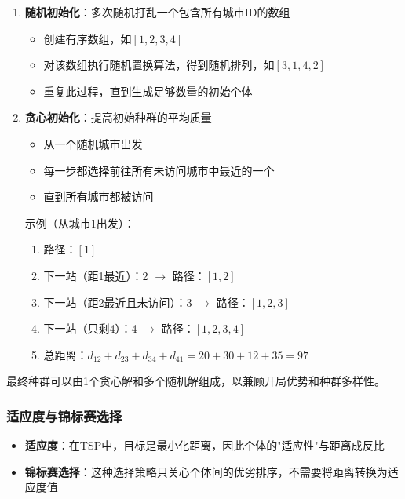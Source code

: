 \begin{enumerate}
    \item \textbf{随机初始化}：多次随机打乱一个包含所有城市ID的数组
    \begin{itemize}
        \item 创建有序数组，如$[1, 2, 3, 4]$
        \item 对该数组执行随机置换算法，得到随机排列，如$[3, 1, 4, 2]$
        \item 重复此过程，直到生成足够数量的初始个体
    \end{itemize}
    
    \item \textbf{贪心初始化}：提高初始种群的平均质量
    \begin{itemize}
        \item 从一个随机城市出发
        \item 每一步都选择前往所有未访问城市中最近的一个
        \item 直到所有城市都被访问
    \end{itemize}
    
    示例（从城市1出发）：
    \begin{enumerate}
        \item 路径：$[1]$
        \item 下一站（距1最近）：2 $\to$ 路径：$[1, 2]$
        \item 下一站（距2最近且未访问）：3 $\to$ 路径：$[1, 2, 3]$
        \item 下一站（只剩4）：4 $\to$ 路径：$[1, 2, 3, 4]$
        \item 总距离：$d_{12} + d_{23} + d_{34} + d_{41} = 20 + 30 + 12 + 35 = 97$
    \end{enumerate}
\end{enumerate}

最终种群可以由1个贪心解和多个随机解组成，以兼顾开局优势和种群多样性。

\subsubsection{适应度与锦标赛选择}

\begin{itemize}
    \item \textbf{适应度}：在TSP中，目标是最小化距离，因此个体的"适应性"与距离成反比
    \item \textbf{锦标赛选择}：这种选择策略只关心个体间的优劣排序，不需要将距离转换为适应度值
\end{itemize}

